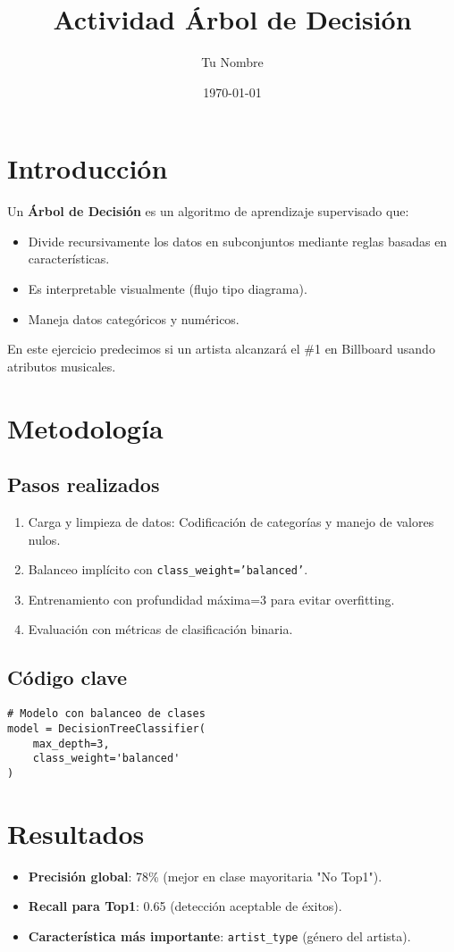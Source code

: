 \documentclass{article}
\title{Actividad Árbol de Decisión}
\author{Tu Nombre}
\date{\today}
\begin{document}
\maketitle

\section{Introducción}
Un \textbf{Árbol de Decisión} es un algoritmo de aprendizaje supervisado que:
\begin{itemize}
    \item Divide recursivamente los datos en subconjuntos mediante reglas basadas en características.
    \item Es interpretable visualmente (flujo tipo diagrama).
    \item Maneja datos categóricos y numéricos.
\end{itemize}
En este ejercicio predecimos si un artista alcanzará el \#1 en Billboard usando atributos musicales.

\section{Metodología}
\subsection{Pasos realizados}
\begin{enumerate}
    \item Carga y limpieza de datos: Codificación de categorías y manejo de valores nulos.
    \item Balanceo implícito con \texttt{class\_weight='balanced'}.
    \item Entrenamiento con profundidad máxima=3 para evitar overfitting.
    \item Evaluación con métricas de clasificación binaria.
\end{enumerate}

\subsection{Código clave}
\begin{lstlisting}
# Modelo con balanceo de clases
model = DecisionTreeClassifier(
    max_depth=3,
    class_weight='balanced'
)
\end{lstlisting}

\section{Resultados}
\begin{itemize}
    \item \textbf{Precisión global}: 78\% (mejor en clase mayoritaria "No Top1").
    \item \textbf{Recall para Top1}: 0.65 (detección aceptable de éxitos).
    \item \textbf{Característica más importante}: \texttt{artist\_type} (género del artista).
\end{itemize}
\end{document}
